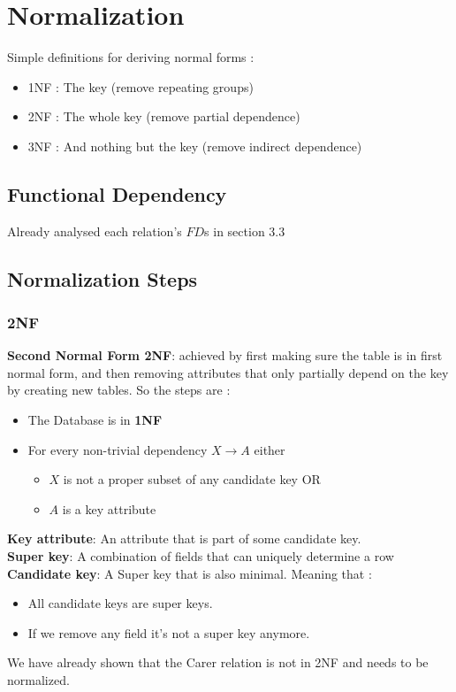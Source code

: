 \section{Normalization}
Simple definitions for deriving normal forms :
\begin{itemize}
    \item 1NF : The key (remove repeating groups)
    \item 2NF : The whole key (remove partial dependence)
    \item 3NF : And nothing but the key (remove indirect dependence)
\end{itemize}

\subsection{Functional Dependency}
Already analysed each relation's $FD$s in section 3.3
\subsection{Normalization Steps}
\subsubsection{2NF}
\begin{tcolorbox}
    \textbf{Second Normal Form 2NF}: achieved by first making sure the table is in first normal form, and then removing attributes that only partially depend on the key by creating new tables. So the steps are :
    \begin{itemize}
        \item The Database is in \textbf{1NF}
        \item For every non-trivial dependency $X\rightarrow A$ either
        \begin{itemize}
            \item $X$ is not a proper subset of any candidate key OR
            \item $A$ is a key attribute
        \end{itemize}
    \end{itemize}
     \textbf{Key attribute}: An attribute that is part of some candidate key.\\
     \textbf{Super key}: A combination of fields that can uniquely determine a row \\
    \textbf{Candidate key}: A Super key that is also minimal. Meaning that :
     \begin{itemize}
         \item All candidate keys are super keys. 
         \item If we remove any field it's not a super key anymore.
     \end{itemize}
\end{tcolorbox}
We have already shown that the Carer relation is not in 2NF and needs to be normalized.


